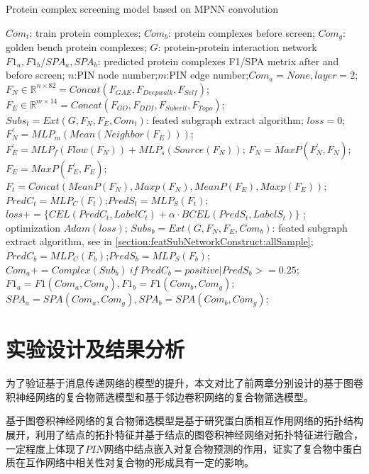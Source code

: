 \begin{algorithm}[h]
    \caption{Protein complex screening model based on MPNN convolution} %
    \label{alg:mpnngcn-screen}
    \begin{algorithmic}[1]
        \Require
        $Com_t$: train protein complexes;
        $Com_b$: protein complexes before screen;
        $Com_g$: golden bench protein complexes;
        $G$: protein-protein interaction network
        \Ensure
        $F1_a,F1_b/SPA_a,SPA_b$: predicted protein complexes F1/SPA metrix after and before screen;
        \State $n$:PIN node number;$m$:PIN edge number;$Com_a=None,layer=2$;
        \State $F_{N} \in \mathbb{R}^{n\times 82}=Concat(F_{GAE},F_{Deepwalk},F_{Self})$;
        \State $F_{E} \in \mathbb{R}^{m\times 14}=Concat(F_{GO},F_{DDI},F_{Subcell},F_{Topo})$;
        \State $Subs_t=Ext(G,F_{N},F_{E},Com_t)$: feated subgraph extract algorithm;
         $loss=0$;
        \State $F_{N}^\prime =MLP_m(Mean(Neighbor(F_{E})))$;
        \State $F_{E}^\prime =MLP_f(Flow(F_{N}))+MLP_s(Source(F_{N}))$;
        \State $F_{N} =MaxP(F_{N}^\prime,F_{N})$;$F_{E}=MaxP(F_{E}^\prime,F_{E})$;
        \EndFor
        \State $F_t=Concat(MeanP(F_{N}),Maxp(F_{N}),MeanP(F_{E}),Maxp(F_{E}))$;
        \State $PredC_t=MLP_C(F_t)$;$PredS_t=MLP_S(F_t)$;
        \State $loss+=\{CEL(PredC_t,LabelC_t)+\alpha \cdot BCEL(PredS_t,LabelS_t)\}$
        \EndFor; optimization $Adam(loss)$;
        \EndFor
        \EndFor
        \State $Subs_b=Ext(G,F_{N},F_{E},Com_b)$: feated subgraph extract algorithm, see in \ref{section:featSubNetworkConstruct:allSample};
         $PredC_b=MLP_C(F_b)$;$PredS_b=MLP_S(F_b)$;
        \State $Com_a+=Complex(Sub_b)~if~PredC_b=positive|PredS_b>=0.25$;
        \EndFor
        \State $F1_a=F1(Com_a,Com_g),F1_b=F1(Com_b,Com_g)$;
        \State $SPA_a=SPA(Com_a,Com_g),SPA_b=SPA(Com_b,Com_g)$;
    \end{algorithmic}
\end{algorithm}
\section{实验设计及结果分析}
\label{section:MPNN:experience}
为了验证基于消息传递网络的模型的提升，本文对比了前两章分别设计的基于图卷积神经网络的复合物筛选模型和基于邻边卷积网络的复合物筛选模型。

基于图卷积神经网络的复合物筛选模型是基于研究蛋白质相互作用网络的拓扑结构展开，利用了结点的拓扑特征并基于结点的图卷积神经网络对拓扑特征进行融合，一定程度上体现了$PIN$网络中结点嵌入对复合物预测的作用，证实了复合物中蛋白质在互作网络中相关性对复合物的形成具有一定的影响。

